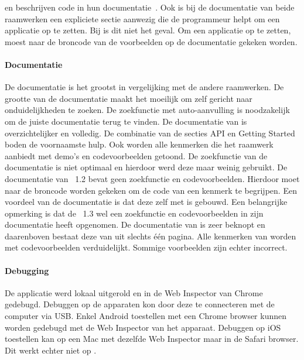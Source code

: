 \jqm{} en \kendo{} beschrijven  code in hun documentatie~\cite{JQuery2012b,Telerikd}.
Ook is bij de documentatie van beide raamwerken een expliciete sectie aanwezig die de programmeur helpt om een applicatie op te zetten.
Bij \lungo{} is dit niet het geval.  
Om een \lungo{} applicatie op te zetten, moest naar de broncode van de voorbeelden op de documentatie gekeken worden.

\paragraph{Documentatie}
De \st{} documentatie is het grootst in vergelijking met de andere raamwerken.
De grootte van de documentatie maakt het moeilijk om zelf gericht naar onduidelijkheden te zoeken.
De zoekfunctie met auto-aanvulling is noodzakelijk om de juiste documentatie terug te vinden.
De documentatie van \kendo{} is overzichtelijker en volledig.
De combinatie van de secties API en Getting Started boden de voornaamste hulp.
Ook worden alle kenmerken die het raamwerk aanbiedt met demo's en codevoorbeelden getoond.
De zoekfunctie van de documentatie is niet optimaal en hierdoor werd deze maar weinig gebruikt.
De documentatie van \jqm{}~1.2 bevat geen zoekfunctie en codevoorbeelden.
Hierdoor moet naar de broncode worden gekeken om de code van een kenmerk te begrijpen.
Een voordeel van de \jqm{} documentatie is dat deze zelf met \jqm{} is gebouwd.
Een belangrijke opmerking is dat de \jqm{}~1.3 wel een zoekfunctie en codevoorbeelden in zijn documentatie heeft opgenomen.
De documentatie van \lungo{} is zeer beknopt en daarenboven bestaat deze van \quo{} uit slechts één pagina.
Alle kenmerken van \lungo{} worden met codevoorbeelden verduidelijkt.
Sommige voorbeelden zijn echter incorrect.

\paragraph{Debugging}
De applicatie werd lokaal uitgerold en in de Web Inspector van Chrome gedebugd.
Debuggen op de apparaten kon door deze te connecteren met de computer via USB.
Enkel Android toestellen met een Chrome browser kunnen worden gedebugd met de Web Inspector van het apparaat.
Debuggen op iOS toestellen kan op een Mac met dezelfde Web Inspector maar in de Safari browser.
Dit werkt echter niet op \ipadi{}.

